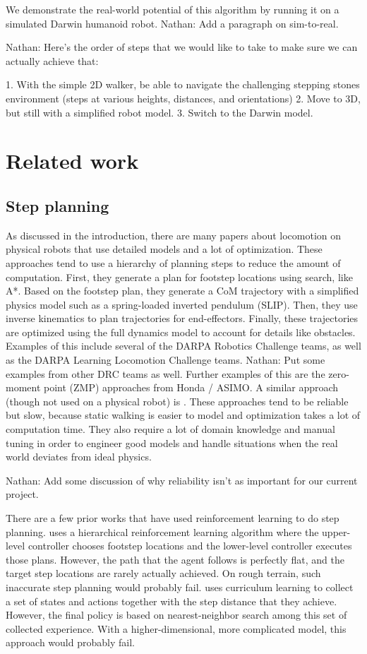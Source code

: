 \documentclass[a4paper]{article}
\newcommand{\nhatch}[1]{{\leavevmode\color{blue} Nathan: #1}}
\begin{document}
We demonstrate the real-world potential of this algorithm by running it on a simulated Darwin humanoid robot. \nhatch{Add a paragraph on sim-to-real.}

\nhatch{Here's the order of steps that we would like to take to make sure we can actually achieve that:

1. With the simple 2D walker, be able to navigate the challenging stepping stones environment (steps at various heights, distances, and orientations)
2. Move to 3D, but still with a simplified robot model.
3. Switch to the Darwin model.}

\section{Related work}

\subsection{Step planning}

As discussed in the introduction, there are many papers about locomotion on physical robots that use detailed models and a lot of optimization. These approaches tend to use a hierarchy of planning steps to reduce the amount of computation. First, they generate a plan for footstep locations using search, like A*. Based on the footstep plan, they generate a CoM trajectory with a simplified physics model such as a spring-loaded inverted pendulum (SLIP). Then, they use inverse kinematics to plan trajectories for end-effectors. Finally, these trajectories are optimized using the full dynamics model to account for details like obstacles. Examples of this include several of the DARPA Robotics Challenge teams, as well as the DARPA Learning Locomotion Challenge teams. \nhatch{Put some examples from other DRC teams as well.} Further examples of this are the zero-moment point (ZMP) approaches from Honda / ASIMO. A similar approach (though not used on a physical robot) is \cite{mordatch2010robust}. These approaches tend to be reliable but slow, because static walking is easier to model and optimization takes a lot of computation time. They also require a lot of domain knowledge and manual tuning in order to engineer good models and handle situations when the real world deviates from ideal physics.

\nhatch{Add some discussion of why reliability isn't as important for our current project.}

There are a few prior works that have used reinforcement learning to do step planning. \cite{peng2017deeploco} uses a hierarchical reinforcement learning algorithm where the upper-level controller chooses footstep locations and the lower-level controller executes those plans. However, the path that the agent follows is perfectly flat, and the target step locations are rarely actually achieved. On rough terrain, such inaccurate step planning would probably fail. \cite{karpathy2012curriculum} uses curriculum learning to collect a set of states and actions together with the step distance that they achieve. However, the final policy is based on nearest-neighbor search among this set of collected experience. With a higher-dimensional, more complicated model, this approach would probably fail.
\end{document}
